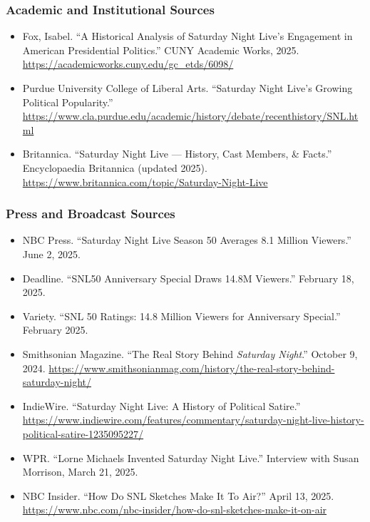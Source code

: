 \documentclass[11pt,letterpaper]{article}
\begin{document}
\subsubsection{Academic and Institutional Sources}
\begin{itemize}[noitemsep]
  \item Fox, Isabel. ``A Historical Analysis of Saturday Night Live's Engagement in American Presidential Politics.'' CUNY Academic Works, 2025. \url{https://academicworks.cuny.edu/gc_etds/6098/}
  \item Purdue University College of Liberal Arts. ``Saturday Night Live's Growing Political Popularity.'' \url{https://www.cla.purdue.edu/academic/history/debate/recenthistory/SNL.html}
  \item Britannica. ``Saturday Night Live --- History, Cast Members, \& Facts.'' Encyclopaedia Britannica (updated 2025). \url{https://www.britannica.com/topic/Saturday-Night-Live}
\end{itemize}

\subsubsection{Press and Broadcast Sources}
\begin{itemize}[noitemsep]
  \item NBC Press. ``Saturday Night Live Season 50 Averages 8.1 Million Viewers.'' June 2, 2025.
  \item Deadline. ``SNL50 Anniversary Special Draws 14.8M Viewers.'' February 18, 2025.
  \item Variety. ``SNL 50 Ratings: 14.8 Million Viewers for Anniversary Special.'' February 2025.
  \item Smithsonian Magazine. ``The Real Story Behind \textit{Saturday Night}.'' October 9, 2024. \url{https://www.smithsonianmag.com/history/the-real-story-behind-saturday-night/}
  \item IndieWire. ``Saturday Night Live: A History of Political Satire.'' \url{https://www.indiewire.com/features/commentary/saturday-night-live-history-political-satire-1235095227/}
  \item WPR. ``Lorne Michaels Invented Saturday Night Live.'' Interview with Susan Morrison, March 21, 2025.
  \item NBC Insider. ``How Do SNL Sketches Make It To Air?'' April 13, 2025. \url{https://www.nbc.com/nbc-insider/how-do-snl-sketches-make-it-on-air}
\end{itemize}
\end{document}
